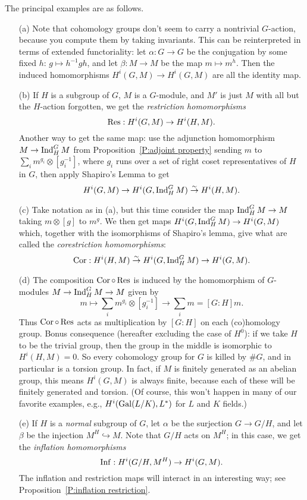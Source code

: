 The principal examples are as follows.
\begin{enumerate}
\item[(a)]
Note that cohomology groups don't
seem to carry a nontrivial $G$-action, because you compute them by taking
invariants. This can be reinterpreted in terms of
extended functoriality: let $\alpha: G \to G$ be the conjugation by some
fixed $h$: $g \mapsto h^{-1}gh$, and let $\beta: M \to M$ be the map
$m \mapsto m^h$. Then the induced homomorphisms $H^i(G,M) \to H^i(G,M)$ are
all the identity map.

\item[(b)] If $H$ is a subgroup of $G$, $M$ is a $G$-module, and
$M'$ is just $M$ with all but the $H$-action forgotten, we get
the \emph{restriction homomorphisms}
\[
\operatorname{Res}: H^i(G, M) \to H^i(H, M).
\]
Another way to get the same map: 
use the adjunction homomorphism
$M \to \operatorname{Ind}^G_H M$ from Proposition~\ref{P:adjoint property} sending $m$ to $\sum_i m^{g_i} \otimes [g_i^{-1}]$, where
$g_i$ runs over a set of right coset representatives of $H$ in $G$,
then apply Shapiro's Lemma to get
\[
H^i(G, M) \to H^i(G, \operatorname{Ind}^G_H M) \stackrel{\sim}{\to} H^i(H, M).
\]
\item[(c)]
Take notation as in (a), but this time 
consider the map $\operatorname{Ind}^G_H M \to M$ taking $m \otimes [g]$ to $m^g$.
We then get maps
$H^i(G, \operatorname{Ind}^G_H M) \to H^i(G,M)$ which, together with the isomorphisms
of Shapiro's lemma, give what are called the \emph{corestriction
homomorphisms}:
\[
\operatorname{Cor}: H^i(H, M) \stackrel{\sim}{\to} H^i(G, \operatorname{Ind}^G_H M) \to H^i(G, M).
\]
\item[(d)]
The composition $\operatorname{Cor} \circ \operatorname{Res}$ is induced by the homomorphism of
$G$-modules $M \to \operatorname{Ind}^G_H M \to M$ given by
\[
m \mapsto \sum_i m^{g_i} \otimes [g_i^{-1}] \to \sum_i m = [G:H]m.
\]
Thus $\operatorname{Cor} \circ \operatorname{Res}$ acts as multiplication by $[G:H]$ on each 
(co)homology group. Bonus consequence (hereafter excluding the case of $H^0$):
if we take $H$ to be the trivial group,
then the group in the middle is isomorphic to $H^i(H, M) = 0$.
So every cohomology group for $G$ is killed by $\#G$, and in particular
is a torsion group. In fact, if $M$ is finitely generated as an abelian
group, this means
$H^i(G, M)$ is always finite, because each of these will be finitely generated
and torsion. (Of course, this won't happen in many of
our favorite examples, e.g., $H^i(\operatorname{Gal}(L/K), L^*)$ for $L$ and $K$ fields.)
\item[(e)]
If $H$ is a \emph{normal} subgroup of $G$, let $\alpha$ be the surjection
$G \to G/H$, and let $\beta$ be the injection $M^H \hookrightarrow M$.
Note that $G/H$ acts on $M^H$; in this case, we get the \emph{inflation
homomorphisms}
\[
\operatorname{Inf}: H^i(G/H, M^H) \to H^i(G, M).
\]
The inflation and restriction maps will interact in an interesting way; see
Proposition~\ref{P:inflation restriction}.
\end{enumerate}


